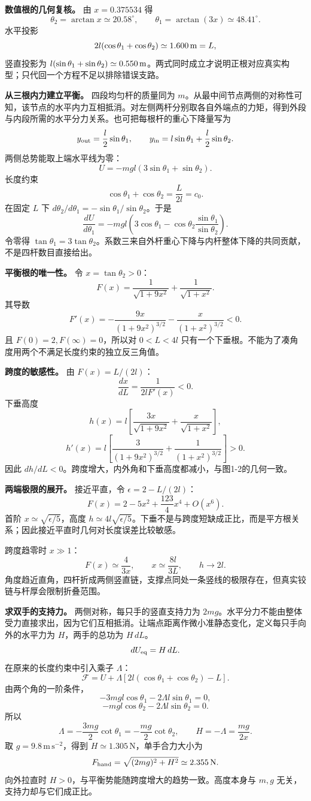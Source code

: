 \documentclass[12pt,a4paper,UTF8]{ctexart}
\begin{document}
\textbf{数值根的几何复核。} 由 \(x=0.375534\) 得 \[
\theta_2=\arctan x\simeq20.58^\circ,
\qquad
\theta_1=\arctan(3x)\simeq48.41^\circ.
\] 水平投影 \[
2l(\cos\theta_1+\cos\theta_2)
\simeq1.600\,{\rm m}=L,
\] 竖直投影为
\(l(\sin\theta_1+\sin\theta_2)\simeq0.550\,{\rm m}\)。两式同时成立才说明正根对应真实构型；只代回一个方程不足以排除错误支路。

\textbf{从三根内力建立平衡。} 四段均匀杆的质量同为
\(m\)。从最中间节点两侧的对称性可知，该节点的水平内力互相抵消。对左侧两杆分别取各自外端点的力矩，得到外段与内段所需的水平分力关系。也可把每根杆的重心下降量写为
\[
y_{\rm out}=\frac l2\sin\theta_1,\qquad
y_{\rm in}=l\sin\theta_1+\frac l2\sin\theta_2.
\] 两侧总势能取上端水平线为零： \[
U=-mgl(3\sin\theta_1+\sin\theta_2).
\] 长度约束 \[
\cos\theta_1+\cos\theta_2=\frac L{2l}=c_0.
\] 在固定 \(L\) 下
\(d\theta_2/d\theta_1=-\sin\theta_1/\sin\theta_2\)。于是 \[
\frac{dU}{d\theta_1}
=-mgl\left(3\cos\theta_1
-\cos\theta_2\frac{\sin\theta_1}{\sin\theta_2}\right).
\] 令零得
\(\tan\theta_1=3\tan\theta_2\)。系数三来自外杆重心下降与内杆整体下降的共同贡献，不是四杆数目直接给出。

\textbf{平衡根的唯一性。} 令 \(x=\tan\theta_2>0\)： \[
F(x)=\frac1{\sqrt{1+9x^2}}+\frac1{\sqrt{1+x^2}}.
\] 其导数 \[
F'(x)=-\frac{9x}{(1+9x^2)^{3/2}}
-\frac{x}{(1+x^2)^{3/2}}<0.
\] 且 \(F(0)=2,F(\infty)=0\)，所以对 \(0<L<4l\)
只有一个下垂根。不能为了凑角度用两个不满足长度约束的独立反三角值。

\textbf{跨度的敏感性。} 由 \(F(x)=L/(2l)\)： \[
\frac{dx}{dL}=\frac1{2lF'(x)}<0.
\] 下垂高度 \[
h(x)=l\left[\frac{3x}{\sqrt{1+9x^2}}
+\frac{x}{\sqrt{1+x^2}}\right],
\] \[
h'(x)=l\left[\frac3{(1+9x^2)^{3/2}}
+\frac1{(1+x^2)^{3/2}}\right]>0.
\] 因此
\(dh/dL<0\)。跨度增大，内外角和下垂高度都减小，与图1-2的几何一致。

\textbf{两端极限的展开。} 接近平直，令 \(\epsilon=2-L/(2l)\)： \[
F(x)=2-5x^2+\frac{123}4x^4+O(x^6).
\] 首阶 \(x\simeq\sqrt{\epsilon/5}\)，高度
\(h\simeq4l\sqrt{\epsilon/5}\)。下垂不是与跨度短缺成正比，而是平方根关系；因此接近平直时几何对长度误差比较敏感。

跨度趋零时 \(x\gg1\)： \[
F(x)\simeq\frac4{3x},\qquad
x\simeq\frac{8l}{3L},\qquad h\to2l.
\]
角度趋近直角，四杆折成两侧竖直链，支撑点同处一条竖线的极限存在，但真实铰链与杆厚会限制折叠范围。

\textbf{求双手的支持力。} 两侧对称，每只手的竖直支持力为
\(2mg\)。水平分力不能由整体受力直接求出，因为它们互相抵消。让端点距离作微小准静态变化，定义每只手向外的水平力为
\(H\)，两手的总功为 \(H\,dL\)。 \[
dU_{\rm eq}=H\,dL.
\] 在原来的长度约束中引入乘子 \(\Lambda\)： \[
\mathcal F=U+\Lambda[2l(\cos\theta_1+\cos\theta_2)-L].
\] 由两个角的一阶条件， \[
-3mgl\cos\theta_1-2\Lambda l\sin\theta_1=0,
\] \[
-mgl\cos\theta_2-2\Lambda l\sin\theta_2=0.
\] 所以 \[
\Lambda=-\frac{3mg}{2}\cot\theta_1
=-\frac{mg}{2}\cot\theta_2,\qquad
\boxed{H=-\Lambda=\frac{mg}{2x}}.
\] 取 \(g=9.8\,\mathrm{m\,s^{-2}}\)，得到
\(H\simeq1.305\,\mathrm N\)，单手合力大小为 \[
F_{\rm hand}=\sqrt{(2mg)^2+H^2}\simeq2.355\,\mathrm N.
\] 向外拉直时 \(H>0\)，与平衡势能随跨度增大的趋势一致。高度本身与
\(m,g\) 无关，支持力却与它们成正比。
\end{document}
